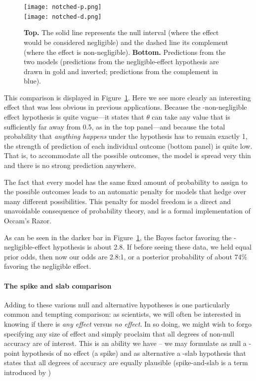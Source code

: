 \begin{figure}[t]
\texttt{[image: notched-p.png]}\\
\texttt{[image: notched-d.png]}
\caption{\textbf{Top.} The solid line represents the null interval (where the effect would be considered negligible) and the dashed line its complement (where the effect is non-negligible). \textbf{Bottom.} Predictions from the two models (predictions from the negligible-effect hypothesis are drawn in gold and inverted; predictions from the complement in blue).}\label{fig:r}
\end{figure}

This comparison is displayed in Figure~\ref{fig:r}. Here we see more clearly an interesting effect that was less obvious in previous applications.  Because the \hyp{non-negligible effect hypothesis} is quite vague---it states that $\theta$ can take any value that is sufficiently far away from 0.5, as in the top panel---and because the total probability that \emph{anything happens} under the hypothesis has to remain exactly 1, the strength of prediction of each individual outcome (bottom panel) is quite low.  That is, to accommodate all the possible outcomes, the model is spread very thin and there is no strong prediction anywhere.

The fact that every model has the same fixed amount of probability to assign to the possible outcomes leads to an automatic penalty for models that hedge over many different possibilities.  This penalty for model freedom is a direct and unavoidable consequence of probability theory, and is a formal implementation of Occam's Razor.

As can be seen in the darker bar in Figure~\ref{fig:r}, the Bayes factor favoring the \hyp{negligible-effect hypothesis} is about 2.8.  If before seeing these data, we held equal prior odds, then now our odds are 2.8:1, or a posterior probability of about 74\% favoring the negligible effect.

\paragraph{The spike and slab comparison} 
Adding to these various null and alternative hypotheses is one particularly common and tempting comparison: as scientists, we will often be interested in knowing if there is \emph{any effect} versus \emph{no effect}.  In so doing, we might wish to forgo specifying any size of effect and simply proclaim that all degrees of non-null accuracy are of interest. This is an ability we have -- we may formulate as null a \hyp{point hypothesis} of no effect (a spike) and as alternative a \hyp{slab hypothesis} that states that all degrees of accuracy are equally plausible (spike-and-slab is a term introduced by )

